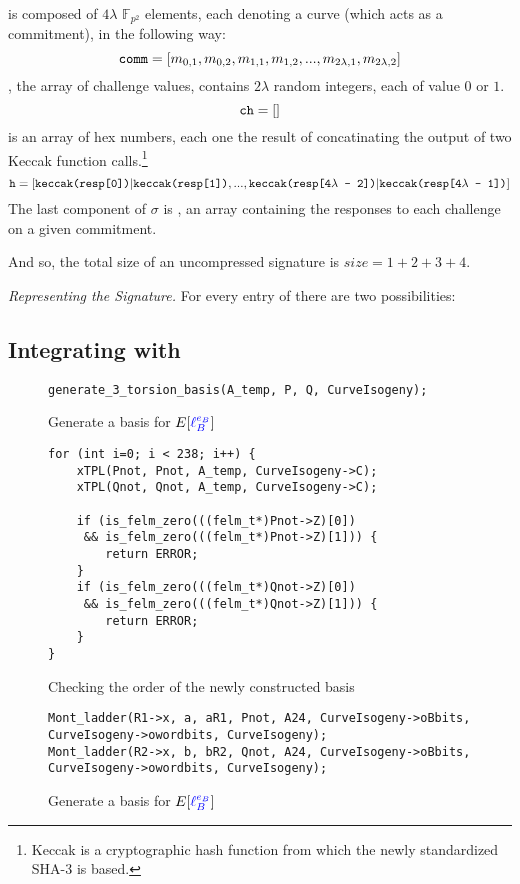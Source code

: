  is composed of $4\lambda$ $\mathbb{F}_{p^2}$ elements, each denoting a curve (which acts as a commitment), in the following way:
$$
\texttt{comm} = [m_{0, 1}, m_{0, 2}, m_{1, 1}, m_{1, 2}, ... , m_{2\lambda, 1}, m_{2\lambda, 2}]
$$
, the array of challenge values, contains $2\lambda$ random integers, each of value $0$ or $1$. 
$$
\texttt{ch} = []
$$
 is an array of hex numbers, each one the result of concatinating the output of two Keccak function calls.\footnote{Keccak is a cryptographic hash function from which the newly standardized SHA-3 is based.} 
$$
\texttt{h} = [\texttt{keccak(resp[0])}|\texttt{keccak(resp[1])}, ... , \texttt{keccak(resp[4}\lambda\texttt{ - 2])}|\texttt{keccak(resp[4}\lambda\texttt{ - 1])}]
$$
The last component of $\sigma$ is , an array containing the responses to each challenge on a given commitment. 

And so, the total size of an uncompressed signature is $size = 1 + 2 + 3 + 4$.

\textit{Representing the Signature.} For every entry of  there are two possibilities: 


\subsection{Integrating with \sidh}

\begin{figure}[!h]
\begin{lstlisting}
generate_3_torsion_basis(A_temp, P, Q, CurveIsogeny);
\end{lstlisting}
\caption{Generate a basis for $E[\textcolor{blue}{\ell_{B}^{e_B}}]$}
\label{code:sigstruct}
\end{figure}

\begin{figure}[!h]
\begin{lstlisting}
for (int i=0; i < 238; i++) {
	xTPL(Pnot, Pnot, A_temp, CurveIsogeny->C);
	xTPL(Qnot, Qnot, A_temp, CurveIsogeny->C);

	if (is_felm_zero(((felm_t*)Pnot->Z)[0]) 
	 && is_felm_zero(((felm_t*)Pnot->Z)[1])) {
		return ERROR;
	}
	if (is_felm_zero(((felm_t*)Qnot->Z)[0]) 
	 && is_felm_zero(((felm_t*)Qnot->Z)[1])) {
		return ERROR;
	}
}
\end{lstlisting}
\caption{Checking the order of the newly constructed basis}
\label{code:checkorder}
\end{figure}

\begin{figure}[!h]
\begin{lstlisting}
Mont_ladder(R1->x, a, aR1, Pnot, A24, CurveIsogeny->oBbits, CurveIsogeny->owordbits, CurveIsogeny);
Mont_ladder(R2->x, b, bR2, Qnot, A24, CurveIsogeny->oBbits, CurveIsogeny->owordbits, CurveIsogeny);
\end{lstlisting}
\caption{Generate a basis for $E[\textcolor{blue}{\ell_{B}^{e_B}}]$}
\label{code:sigstruct}
\end{figure}

